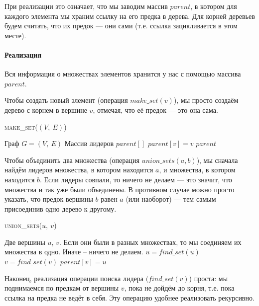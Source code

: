 \documentclass[a4paper,12pt]{article}
\newcommand{\algname}[1]{\textsc{#1}}
\begin{document}
При реализации это означает, что мы заводим массив $parent$, в котором для каждого элемента мы храним ссылку на его предка в дерева. Для корней деревьев будем считать, что их предок — они сами (т.е. ссылка зацикливается в этом месте).

\paragraph{Реализация}

Вся информация о множествах элементов хранится у нас с помощью массива $parent$.

Чтобы создать новый элемент (операция $make\_set(v)$), мы просто создаём дерево с корнем в вершине $v$, отмечая, что её предок — это она сама.

\begin{algorithm}
  	\caption{\algname{make\_set}($(V,\ E)$)}
	\begin{algorithmic}
	    \Require Граф $G = (V,\ E)$
	    \Ensure Массив лидеров $parent[]$
	    \State
	        \State $parent[v] = v$
	   \EndFor
	   \Return $parent$
	\end{algorithmic}
\end{algorithm}

Чтобы объединить два множества (операция $union\_sets(a,b)$), мы сначала найдём лидеров множества, в котором находится $a$, и множества, в котором находится $b$. Если лидеры совпали, то ничего не делаем — это значит, что множества и так уже были объединены. В противном случае можно просто указать, что предок вершины $b$ равен $a$ (или наоборот) — тем самым присоединив одно дерево к другому.

\begin{algorithm}
  	\caption{\algname{union\_sets}($u,\ v$)}
	\begin{algorithmic}
	    \Require Две вершины $u$, $v$.
	    \Ensure Если они были в разных множествах, то мы соединяем их множества в одно. Иначе -- ничего не делаем.
	    \State
	    \State $u = find\_set(u)$
	    \State $v = find\_set(v)$
	    \If{$u \neq v$}
	        \State $parent[v] = u$
	   \EndIf
	\end{algorithmic}
\end{algorithm}

Наконец, реализация операции поиска лидера $(find\_set(v)$) проста: мы поднимаемся по предкам от вершины $v$, пока не дойдём до корня, т.е. пока ссылка на предка не ведёт в себя. Эту операцию удобнее реализовать рекурсивно.
\end{document}
